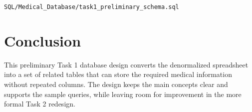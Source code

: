 \documentclass[12pt,a4paper]{article}
\begin{document}
\texttt{SQL/Medical\_Database/task1\_preliminary\_schema.sql}



\section{Conclusion}
This preliminary Task 1 database design converts the denormalized spreadsheet into a set of related
tables that can store the required medical information without repeated columns. The design keeps
the main concepts clear and supports the sample queries, while leaving room for improvement in the
more formal Task 2 redesign.
\end{document}
